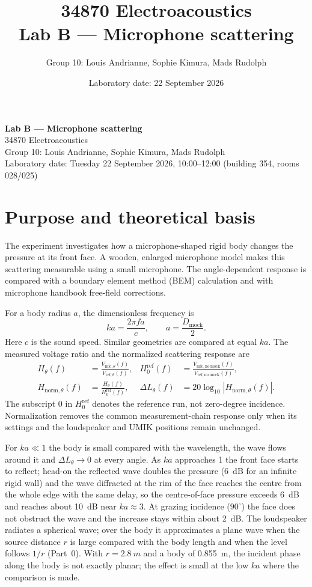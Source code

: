 \documentclass[a4paper,10pt]{article}
\title{34870 Electroacoustics\\Lab B --- Microphone scattering}
\author{Group 10: Louis Andrianne, Sophie Kimura, Mads Rudolph}
\date{Laboratory date: 22 September 2026}
\begin{document}
\begin{center}
{\Large\bfseries Lab B --- Microphone scattering}\\[5pt]
34870 Electroacoustics\\[4pt]
Group 10: Louis Andrianne, Sophie Kimura, Mads Rudolph\\[4pt]
Laboratory date: Tuesday 22 September 2026, 10:00--12:00 (building 354, rooms 028/025)
\end{center}\medskip
\thispagestyle{fancy}

\section{Purpose and theoretical basis}
The experiment investigates how a microphone-shaped rigid body changes the pressure
at its front face. A wooden, enlarged microphone model makes this scattering measurable
using a small microphone. The angle-dependent response is compared with a boundary
element method (BEM) calculation and with microphone handbook free-field corrections.

For a body radius $a$, the dimensionless frequency is
\begin{equation}
ka=\frac{2\pi f a}{c},\qquad a=\frac{D_{\mathrm{mock}}}{2}.
\end{equation}
Here $c$ is the sound speed. Similar geometries are compared at equal $ka$.
The measured voltage ratio and the normalized scattering response are
\begin{align}
H_{\theta}(f)&=\frac{V_{\mathrm{mic},\theta}(f)}{V_{\mathrm{ref},\theta}(f)},&
H_0^{\mathrm{ref}}(f)&=\frac{V_{\mathrm{mic,no\ mock}}(f)}{V_{\mathrm{ref,no\ mock}}(f)},\\
H_{\mathrm{norm},\theta}(f)&=\frac{H_\theta(f)}{H_0^{\mathrm{ref}}(f)},&
\Delta L_\theta(f)&=20\log_{10}|H_{\mathrm{norm},\theta}(f)|.
\end{align}
The subscript $0$ in $H_0^{\mathrm{ref}}$ denotes the reference run, not zero-degree
incidence. Normalization removes the common measurement-chain response only when its
settings and the loudspeaker and UMIK positions remain unchanged.

For $ka\ll1$ the body is small compared with the wavelength, the wave flows around it
and $\Delta L_\theta\to0$ at every angle. As $ka$ approaches 1 the front face starts to
reflect; head-on the reflected wave doubles the pressure (\SI{+6}{dB} for an infinite
rigid wall) and the wave diffracted at the rim of the face reaches the centre from the
whole edge with the same delay, so the centre-of-face pressure exceeds \SI{+6}{dB} and
reaches about \SI{+10}{dB} near $ka\approx3$. At grazing incidence ($90^\circ$) the face
does not obstruct the wave and the increase stays within about \SI{2}{dB}. The
loudspeaker radiates a spherical wave; over the body it approximates a plane wave when
the source distance $r$ is large compared with the body length and when the level
follows $1/r$ (Part~0). With $r=\SI{2.8}{m}$ and a body of \SI{0.855}{m}, the incident
phase along the body is not exactly planar; the effect is small at the low $ka$ where
the comparison is made.
\end{document}
